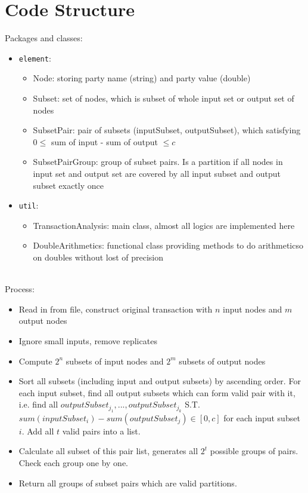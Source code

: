 \documentclass[]{article}
\begin{document}
\section{Code Structure}
Packages and classes:
\begin{itemize}
	\item \texttt{element}:
	\begin{itemize}
		\item{Node}: storing party name (string) and party value (double)
		\item{Subset}: set of nodes, which is subset of whole input set or output set of nodes
		\item{SubsetPair}: pair of subsets (inputSubset, outputSubset), which satisfying $0 \le$ sum of input - sum of output $\le c$
		\item{SubsetPairGroup}: group of subset pairs. Is a partition if all nodes in input set and output set are covered by all input subset and output subset exactly once
	\end{itemize}
	\item \texttt{util}:
	\begin{itemize}
		\item{TransactionAnalysis}: main class, almost all logics are implemented here
		\item{DoubleArithmetics}: functional class providing methods to do arithmeticso on doubles without lost of precision
	\end{itemize}
\end{itemize}
\ \\
Process:
\begin{itemize}
	\item Read in from file, construct original transaction with $n$ input nodes and $m$ output nodes
	\item Ignore small inputs, remove replicates
	\item Compute $2^n$ subsets of input nodes and $2^m$ subsets of output nodes
	\item Sort all subsets (including input and output subsets) by ascending order. For each input subset, find all output subsets which can form valid pair with it, i.e. find all $outputSubset_{j_1}, ..., outputSubset_{j_k}$ S.T. $sum(inputSubset_i) - sum(outputSubset_j) \in [0, c]$ for each input subset $i$. Add all $t$ valid pairs into a list.
	\item Calculate all subset of this pair list, generates all $2^t$ possible groups of pairs. Check each group one by one.
	\item Return all groups of subset pairs which are valid partitions.
\end{itemize}
\end{document}
